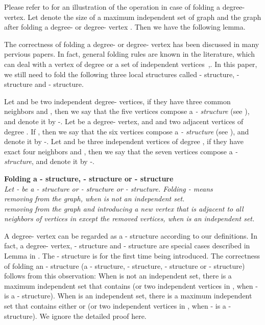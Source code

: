 \documentclass[runningheads]{llncs}
\begin{document}
\vspace{0mm}Please refer to  for an illustration of
the operation in case  of folding a degree- vertex. Let
 denote the size of a maximum independent set of graph
 and  the graph after folding a degree- or
degree- vertex . Then we have the following
lemma.
\vspace{-4mm}

The correctness of folding a degree- or degree- vertex has
been discussed in many pervious papers. In fact, general folding
rules are known in the literature, which can deal with a vertex of
degree  or a set of independent
vertices~\cite{VC2005},\cite{Fomin:is}. In this paper, we still
need to fold the following three local structures called -
structure, - structure and - structure.

Let  and  be two independent degree- vertices, if they
have three common neighbors  and , then we say that the
five vertices compose a \emph{- structure} (see
), and denote it by -. Let 
be a degree- vertex, and  and  two adjacent vertices of
degree . If , then we say that
the six vertices  compose a \emph{-
structure} (see ), and denote it by
-. Let  and  be three independent
vertices of degree  , if they have exact four neighbors
 and , then we say that the seven vertices compose a
\emph{- structure}, and denote it by
-.

\vspace{2mm}\noindent \textbf{Folding a - structure, - structure or - structure}\\
\emph{Let - be a - structure or - structure or
- structure. Folding - means\\
 removing  from the
graph, when  is not an independent set.\\
 removing  from the graph and introducing a new
vertex  that is adjacent to all neighbors of vertices in 
except the removed vertices, when  is an independent
set.}



A degree- vertex can be regarded as a - structure
according to our definitions. In fact, a degree- vertex,
- structure and - structure are special cases
described in Lemma  in \cite{VC2005}. The - structure
is for the first time being introduced. The correctness of folding
an - structure (a - structure, - structure,
- structure or - structure) follows from this
observation: When  is not an independent set, there is a
maximum independent set that contains  (or two independent
vertices in , when - is a - structure). When  is
an independent set, there is a maximum independent set that
contains either  or  (or two independent vertices in ,
when - is a - structure). We ignore the detailed proof
here.
\end{document}
